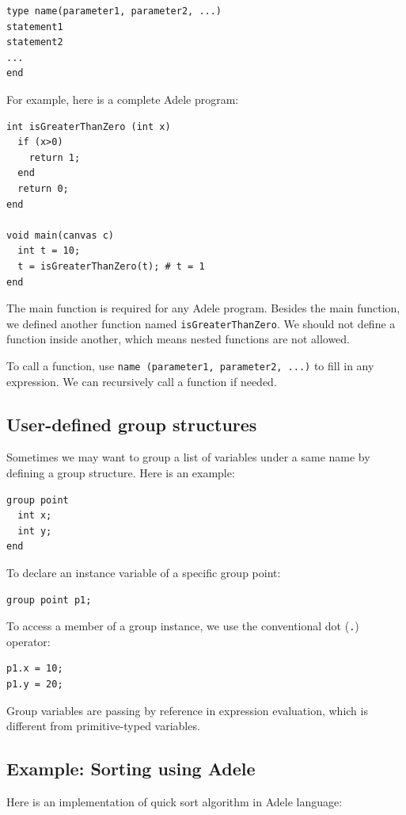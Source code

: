 \documentclass[11pt,letterpaper]{article}
\begin{document}
\begin{lstlisting}
type name(parameter1, parameter2, ...)
statement1
statement2
...
end
\end{lstlisting}

For example, here is a complete Adele program:

\begin{lstlisting}[caption=func.adl, label=func, captionpos=b, tabsize=4, frame=single]
int isGreaterThanZero (int x)
  if (x>0)
    return 1;
  end
  return 0;
end

void main(canvas c)
  int t = 10;
  t = isGreaterThanZero(t); # t = 1
end
\end{lstlisting}

The main function is required for any Adele program. Besides the main function, we defined another function named \texttt{isGreaterThanZero}. We should not define a function inside another, which means nested functions are not allowed.

To call a function, use \texttt{name (parameter1, parameter2, ...)} to fill in any expression. We can recursively call a function if needed.

\subsection {User-defined group structures}
Sometimes we may want to group a list of variables under a same name by defining a group structure. Here is an example:

\begin{lstlisting}
group point
  int x;
  int y;
end
\end{lstlisting}

To declare an instance variable of a specific group point:
\begin{lstlisting}
group point p1;
\end{lstlisting}

To access a member of a group instance, we use the conventional dot (\texttt{.}) operator:
\begin{lstlisting}
p1.x = 10;
p1.y = 20;
\end{lstlisting}

Group variables are passing by reference in expression evaluation, which is different from primitive-typed variables.

\subsection {Example: Sorting using Adele}
Here is an implementation of quick sort algorithm in Adele language:
\end{document}
